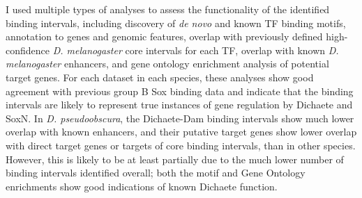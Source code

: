 I used multiple types of analyses to assess the functionality of the identified binding intervals, including discovery of \emph{de novo} and known TF binding motifs, annotation to genes and genomic features, overlap with previously defined high-confidence \emph{D. melanogaster} core intervals for each TF, overlap with known \emph{D. melanogaster} enhancers, and gene ontology enrichment analysis of potential target genes. For each dataset in each species, these analyses show good agreement with previous group B Sox binding data and indicate that the binding intervals are likely to represent true instances of gene regulation by Dichaete and SoxN. In \emph{D. pseudoobscura}, the Dichaete-Dam binding intervals show much lower overlap with known enhancers, and their putative target genes show lower overlap with direct target genes or targets of core binding intervals, than in other species. However, this is likely to be at least partially due to the much lower number of binding intervals identified overall; both the motif and Gene Ontology enrichments show good indications of known Dichaete function.

